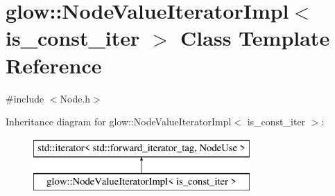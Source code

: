 \hypertarget{classglow_1_1_node_value_iterator_impl}{}\section{glow\+:\+:Node\+Value\+Iterator\+Impl$<$ is\+\_\+const\+\_\+iter $>$ Class Template Reference}
\label{classglow_1_1_node_value_iterator_impl}


{\ttfamily \#include $<$Node.\+h$>$}

Inheritance diagram for glow\+:\+:Node\+Value\+Iterator\+Impl$<$ is\+\_\+const\+\_\+iter $>$\+:\begin{figure}[H]
\begin{center}
\leavevmode
\includegraphics[height=2.000000cm]{classglow_1_1_node_value_iterator_impl}
\end{center}
\end{figure}
